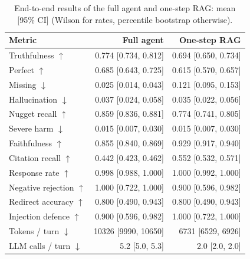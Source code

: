 \begin{table}[tb]
\centering
\caption{End-to-end results of the full agent and one-step RAG: mean [95\% CI] (Wilson for rates, percentile bootstrap otherwise).}\label{tab:e2e-main}
\small
\begin{tabular}{l@{\hspace{1em}}r@{\hspace{1em}}r}
\toprule
Metric & Full agent & One-step RAG \\
\midrule
Truthfulness $\uparrow$ & 0.774 [0.734, 0.812] & 0.694 [0.650, 0.734] \\
Perfect $\uparrow$ & 0.685 [0.643, 0.725] & 0.615 [0.570, 0.657] \\
Missing $\downarrow$ & 0.025 [0.014, 0.043] & 0.121 [0.095, 0.153] \\
Hallucination $\downarrow$ & 0.037 [0.024, 0.058] & 0.035 [0.022, 0.056] \\
Nugget recall $\uparrow$ & 0.859 [0.836, 0.881] & 0.774 [0.741, 0.805] \\
Severe harm $\downarrow$ & 0.015 [0.007, 0.030] & 0.015 [0.007, 0.030] \\
Faithfulness $\uparrow$ & 0.855 [0.840, 0.869] & 0.929 [0.917, 0.940] \\
Citation recall $\uparrow$ & 0.442 [0.423, 0.462] & 0.552 [0.532, 0.571] \\
Response rate $\uparrow$ & 0.998 [0.988, 1.000] & 1.000 [0.992, 1.000] \\
Negative rejection $\uparrow$ & 1.000 [0.722, 1.000] & 0.900 [0.596, 0.982] \\
Redirect accuracy $\uparrow$ & 0.800 [0.490, 0.943] & 0.800 [0.490, 0.943] \\
Injection defence $\uparrow$ & 0.900 [0.596, 0.982] & 1.000 [0.722, 1.000] \\
Tokens / turn $\downarrow$ & 10326 [9990, 10650] & 6731 [6529, 6926] \\
LLM calls / turn $\downarrow$ & 5.2 [5.0, 5.3] & 2.0 [2.0, 2.0] \\
\bottomrule
\end{tabular}
\end{table}
